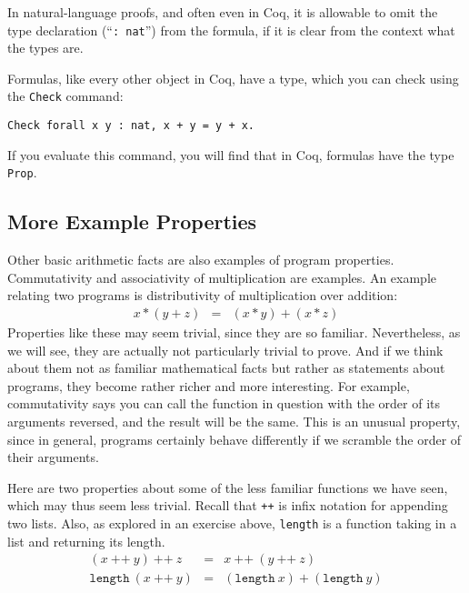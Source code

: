 \documentclass{book}[12pt]
\begin{document}
\noindent In natural-language proofs, and often even in Coq, it is
allowable to omit the type declaration (``\texttt{: nat}'') from the
formula, if it is clear from the context what the types are.

Formulas, like every other object in Coq, have a type, which you can
check using the \texttt{Check} command:

\begin{verbatim}
Check forall x y : nat, x + y = y + x.
\end{verbatim}

\noindent If you evaluate this command, you will find that in Coq,
formulas have the type \texttt{Prop}.  

\subsection{More Example Properties}

Other basic arithmetic facts are also examples of program properties.
Commutativity and associativity of multiplication are examples.  An
example relating two programs is distributivity of multiplication over
addition:
\begin{eqnarray*}
x * (y + z) & = & (x * y) + (x * z)
\end{eqnarray*}
\noindent Properties like these may seem trivial, since they are so
familiar.  Nevertheless, as we will see, they are actually not
particularly trivial to prove.  And if we think about them not as
familiar mathematical facts but rather as statements about programs,
they become rather richer and more interesting.  For example,
commutativity says you can call the function in question with the
order of its arguments reversed, and the result will be the same.
This is an unusual property, since in general, programs certainly
behave differently if we scramble the order of their arguments.

Here are two properties about some of the less familiar functions we
have seen, which may thus seem less trivial.  Recall that \texttt{++} is
infix notation for appending two lists.  Also, as explored in an
exercise above, \texttt{length} is a function taking in a list and
returning its length.
\begin{eqnarray*}
(x\ \texttt{++}\ y)\ \texttt{++}\ z & = & x\ \texttt{++}\ (y\ \texttt{++}\ z)\\
\texttt{length}\ (x\ \texttt{++}\ y) & = & 
  (\texttt{length}\ x) + (\texttt{length}\ y)
\end{eqnarray*}
\end{document}
